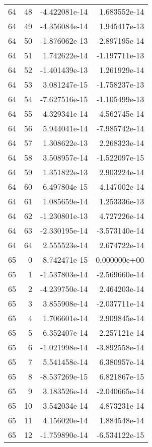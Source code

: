 \begin{tabular}{rrrr}
  64 &   48 & -4.422081e-14 &  1.683552e-14 \\
  64 &   49 & -4.356084e-14 &  1.945417e-13 \\
  64 &   50 & -1.876062e-13 & -2.897195e-14 \\
  64 &   51 &  1.742622e-14 & -1.197711e-13 \\
  64 &   52 & -1.401439e-13 &  1.261929e-14 \\
  64 &   53 &  3.081247e-15 & -1.758237e-13 \\
  64 &   54 & -7.627516e-15 & -1.105499e-13 \\
  64 &   55 &  4.329341e-14 &  4.562745e-14 \\
  64 &   56 &  5.944041e-14 & -7.985742e-14 \\
  64 &   57 &  1.308622e-13 &  2.268323e-14 \\
  64 &   58 &  3.508957e-14 & -1.522097e-15 \\
  64 &   59 &  1.351822e-13 &  2.903224e-14 \\
  64 &   60 &  6.497804e-15 &  4.147002e-14 \\
  64 &   61 &  1.085659e-14 &  1.253336e-13 \\
  64 &   62 & -1.230801e-13 &  4.727226e-14 \\
  64 &   63 & -2.330195e-14 & -3.573140e-14 \\
  64 &   64 &  2.555523e-14 &  2.674722e-14 \\
  65 &    0 &  8.742471e-15 &  0.000000e+00 \\
  65 &    1 & -1.537803e-14 & -2.569660e-14 \\
  65 &    2 & -4.239750e-14 &  2.464203e-14 \\
  65 &    3 &  3.855908e-14 & -2.037711e-14 \\
  65 &    4 &  1.706601e-14 &  2.909845e-14 \\
  65 &    5 & -6.352407e-14 & -2.257121e-14 \\
  65 &    6 & -1.021998e-14 & -3.892558e-14 \\
  65 &    7 &  5.541458e-14 &  6.380957e-14 \\
  65 &    8 & -8.537269e-15 &  6.821867e-15 \\
  65 &    9 &  3.183526e-14 & -2.040665e-14 \\
  65 &   10 & -3.542034e-14 &  4.873231e-14 \\
  65 &   11 &  4.156020e-14 &  1.884548e-14 \\
  65 &   12 & -1.759890e-14 & -6.534122e-15 \\

\end{tabular}
